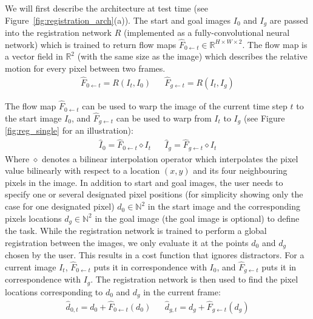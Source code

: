 We will first describe the architecture at test time (see Figure~\ref{fig:registration_arch}(a)). The start and goal images $I_0$ and $I_g$ are passed into the registration network $R$ (implemented as a fully-convolutional neural network) which is trained to return flow maps $\hat{F}_{0 \leftarrow t} \in \mathbb{R}^{H \times W \times 2}$. The flow map is a vector field in $\mathbb{R}^2$ (with the same size as the image) which describes the relative motion for every pixel between two frames.
\begin{align}
    \hat{F}_{0 \leftarrow t} = R(I_t, I_0) &&
    \hat{F}_{g \leftarrow t} = R(I_t, I_g)
\end{align}

The flow map $\hat{F}_{0 \leftarrow t}$ can be used to warp the image of the current time step $t$ to the start image $I_0$, and $\hat{F}_{g \leftarrow t}$ can be used to warp from $I_t$ to $I_g$ (see Figure \ref{fig:reg_single} for an illustration):
\begin{align}
    \hat{I}_0 = \hat{F}_{0 \leftarrow t} \diamond  I_t &&
    \hat{I}_g = \hat{F}_{g \leftarrow t} \diamond  I_t 
\end{align}
Where $\diamond$ denotes a bilinear interpolation operator which interpolates the pixel value bilinearly with respect to a location $(x,y)$ and its four neighbouring pixels in the image.
In addition to start and goal images, the user needs to specify one or several designated pixel positions (for simplicity showing only the case for one designated pixel) $d_0 \in \mathbb{N}^2$ in the start image and the corresponding pixels locations $d_g \in \mathbb{N}^2$ in the goal image (the goal image is optional) to define the task. While the registration network is trained to perform a global registration between the images, we only evaluate it at the points $d_0$ and $d_g$ chosen by the user. This results in a cost function that ignores distractors. For a current image $I_t$, $\hat{F}_{0 \leftarrow t}$ puts it in correspondence with $I_0$, and $\hat{F}_{g \leftarrow t}$ puts it in correspondence with $I_g$. The registration network is then used to find the pixel locations corresponding to $d_0$ and $d_g$ in the current frame: 
\begin{align}
    \hat{d}_{0,t} = d_0 + \hat{F}_{0 \leftarrow t}(d_0) &&
    \hat{d}_{g,t} = d_g + \hat{F}_{g \leftarrow t}(d_g)
    \label{eqn:warped_pos}
\end{align}

